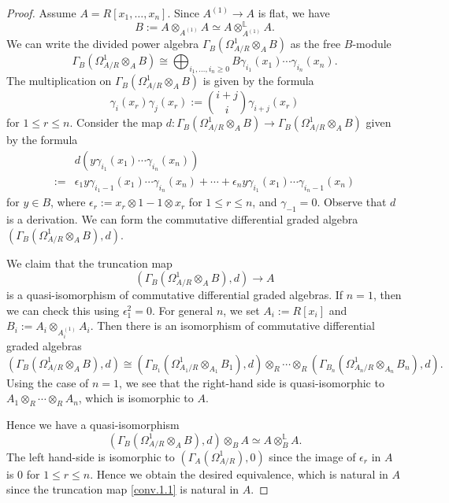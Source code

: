 \documentclass[10pt,a4paper]{amsart}
\renewcommand{\L}{\mathbb{L}}
\begin{document}
\begin{proof}
Assume $A=R[x_1,\ldots,x_n]$.
Since $A^{(1)}\to A$ is flat,
we have
\[
B:=A\otimes_{A^{(1)}}A\simeq A\otimes_{A^{(1)}}^\L A.
\]
We can write the divided power algebra $\Gamma_B(\Omega_{A/R}^1\otimes_A B)$ as the free $B$-module
\[
\Gamma_B(\Omega_{A/R}^1\otimes_A B)
\cong
\bigoplus_{i_1,\ldots,i_n\geq 0} B \gamma_{i_1}(x_1)\cdots \gamma_{i_n}(x_n).
\]
The multiplication on  $\Gamma_B(\Omega_{A/R}^1\otimes_A B)$ is given by the formula
\[
\gamma_i(x_r)\gamma_j(x_r)
:=
\binom{i+j}{i}\gamma_{i+j}(x_r)
\]
for $1\leq r\leq n$.
Consider the map $d\colon \Gamma_B(\Omega_{A/R}^1\otimes_A B)\to \Gamma_B(\Omega_{A/R}^1\otimes_A B)$ given by the formula
\begin{align*}
&d(y\gamma_{i_1}(x_1)\cdots \gamma_{i_n}(x_n)) 
\\
:= &
\epsilon_1 y\gamma_{i_1-1}(x_1)\cdots \gamma_{i_n}(x_n)
+
\cdots
+
\epsilon_n y\gamma_{i_1}(x_1)\cdots \gamma_{i_n-1}(x_n)
\end{align*}
for $y\in B$,
where $\epsilon_r:=x_r\otimes 1-1\otimes x_r$ for $1\leq r\leq n$,
and $\gamma_{-1}=0$.
Observe that $d$ is a derivation.
We can form the commutative differential graded algebra $(\Gamma_B(\Omega_{A/R}^1\otimes_A B),d)$.

We claim that the truncation map
\begin{equation}
\label{conv.1.1}
(\Gamma_B(\Omega_{A/R}^1\otimes_A B),d)
\to
A
\end{equation}
is a quasi-isomorphism of commutative differential graded algebras.
If $n=1$,
then we can check this using $\epsilon_1^2=0$.
For general $n$,
we set $A_i:=R[x_i]$ and $B_i:=A_i\otimes_{A_i^{(1)}}A_i$.
Then there is an isomorphism of commutative differential graded algebras
\[
(\Gamma_B(\Omega_{A/R}^1\otimes_A B),d)
\cong
(\Gamma_{B_1}(\Omega_{A_1/R}^1\otimes_{A_1} B_1),d)
\otimes_R
\cdots
\otimes_R
(\Gamma_{B_n}(\Omega_{A_n/R}^1\otimes_{A_n} B_n),d).
\]
Using the case of $n=1$,
we see that the right-hand side is quasi-isomorphic to $A_1\otimes_R \cdots \otimes_R A_n$,
which is isomorphic to $A$.

Hence we have a quasi-isomorphism
\[
(\Gamma_B(\Omega_{A/R}^1\otimes_A B),d)\otimes_B A
\simeq
A\otimes_B^\L A.
\]
The left hand-side is isomorphic to $(\Gamma_A(\Omega_{A/R}^1),0)$ since the image of $\epsilon_r$ in $A$ is $0$ for $1\leq r\leq n$.
Hence we obtain the desired equivalence,
which is natural in $A$ since the truncation map \eqref{conv.1.1} is natural in $A$.
\end{proof}
\end{document}
